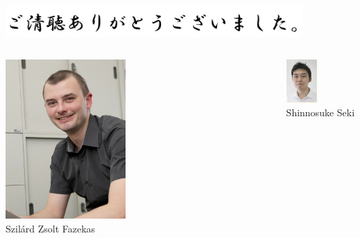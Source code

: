 \begin{frame}

\begin{center}
\includegraphics[width=0.85\textwidth]{fig/goseichou.png}
\end{center}

\begin{center}

\begin{columns}[c]

\begin{column}{0.4\textwidth}
\centering
	\includegraphics[width=0.45\textwidth]{fig/staff_fazekas.jpg}\\
	Szil\'{a}rd Zsolt Fazekas
\end{column}

\begin{column}{0.4\textwidth}
\centering
	\includegraphics[width=0.45\textwidth]{fig/6845-0.jpg}\\
	Shinnosuke Seki
\end{column}


\end{columns}
\end{center}
\end{frame}
